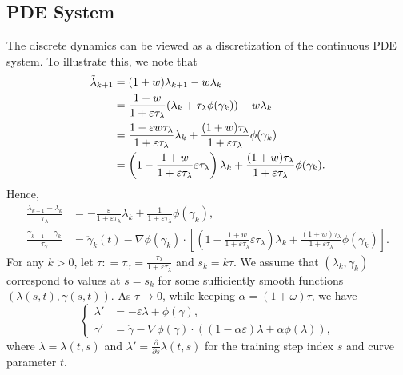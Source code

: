 \documentclass[12pt]{amsart}
\theoremstyle{definition}
\theoremstyle{remark}
\numberwithin{equation}{section}
\numberwithin{equation}{section}
\begin{document}
\subsection{PDE System}\label{sec:PDEsystem} The discrete dynamics can be viewed as a discretization of the continuous PDE system. To illustrate this, we note that 
    \begin{align*}
        \Tilde{\lambda}_{k+1} & = (1+w)\lambda_{k+1}-w\lambda_k\\
        & = \frac{1+w}{1+\varepsilon\tau_{\lambda}}(\lambda_k+\tau_{\lambda}\phi(\gamma_k))-w\lambda_k\\
        & = \frac{1-\varepsilon w\tau_{\lambda}}{1+\varepsilon\tau_{\lambda}}\lambda_k+\frac{(1+w)\tau_{\lambda}}{1+\varepsilon\tau_{\lambda}}\phi(\gamma_k)\\
        & = \left(1-\frac{1+w}{1+\varepsilon \tau_{\lambda}}\varepsilon\tau_{\lambda}\right)\lambda_k+\frac{(1+w)\tau_{\lambda}}{1+\varepsilon\tau_{\lambda}}\phi(\gamma_k).
    \end{align*}
    Hence,
    \begin{align*}
        \frac{\lambda_{k+1}-\lambda_k}{\tau_{\lambda}} & = -\frac{\varepsilon}{1+\varepsilon\tau_{\lambda}}\lambda_k + \frac{1}{1+\varepsilon\tau_{\lambda}}\phi(\gamma_k),\\
        \frac{\gamma_{k+1}-\gamma_k}{\tau_{\gamma}} & = \ddot{\gamma}_k(t)-\nabla\phi(\gamma_k)\cdot\left[ \left(1-\frac{1+w}{1+\varepsilon \tau_{\lambda}}\varepsilon\tau_{\lambda}\right)\lambda_k+\frac{(1+w)\tau_{\lambda}}{1+\varepsilon\tau_{\lambda}}\phi(\gamma_k) \right].
    \end{align*}
    For any $k>0$, let $\tau: =\tau_{\gamma}=\frac{\tau_{\lambda}}{1+\varepsilon\tau_{\lambda}}$ and  $s_k=k\tau$. We assume that $(\lambda_k, \gamma_k)$ correspond to values at $s=s_k$ for some sufficiently smooth functions $(\lambda(s, t), \gamma(s, t))$.
 As $\tau  \to 0$, while keeping $\alpha=(1+\omega)\tau$, we have 
   \begin{equation}\label{eq:equi0}
   \begin{cases}
        \lambda' & = -\varepsilon\lambda + \phi(\gamma),\\
        \gamma' & = \ddot{\gamma} - \nabla\phi(\gamma)\cdot((1-\alpha\varepsilon)\lambda + \alpha\phi(\lambda)),
    \end{cases}
    \end{equation}
    where $\lambda = \lambda(t, s)$ and $\lambda' = \frac{\partial}{\partial s}\lambda(t,s)$ for the training step index $s$ and curve parameter $t$. 
\end{document}
